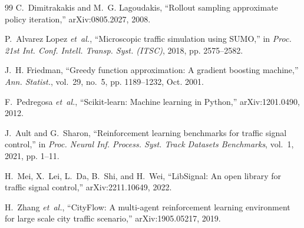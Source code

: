 \documentclass[letterpaper,journal]{IEEEtran}
\begin{document}
\begin{thebibliography}{99}
C.~Dimitrakakis and M.~G. Lagoudakis, ``Rollout sampling approximate policy iteration,'' arXiv:0805.2027, 2008.

P.~Alvarez Lopez \emph{et~al.}, ``Microscopic traffic simulation using {SUMO},'' in \emph{Proc. 21st Int. Conf. Intell. Transp. Syst. (ITSC)}, 2018, pp. 2575--2582.

J.~H. Friedman, ``Greedy function approximation: A gradient boosting machine,'' \emph{Ann. Statist.}, vol.~29, no.~5, pp. 1189--1232, Oct. 2001.

F.~Pedregosa \emph{et~al.}, ``Scikit-learn: Machine learning in {Python},'' arXiv:1201.0490, 2012.

J.~Ault and G.~Sharon, ``Reinforcement learning benchmarks for traffic signal control,'' in \emph{Proc. Neural Inf. Process. Syst. Track Datasets Benchmarks}, vol.~1, 2021, pp. 1--11.

H.~Mei, X.~Lei, L.~Da, B.~Shi, and H.~Wei, ``{LibSignal}: An open library for traffic signal control,'' arXiv:2211.10649, 2022.

H.~Zhang \emph{et~al.}, ``{CityFlow}: A multi-agent reinforcement learning environment for large scale city traffic scenario,'' arXiv:1905.05217, 2019.

\end{thebibliography}
\end{document}
